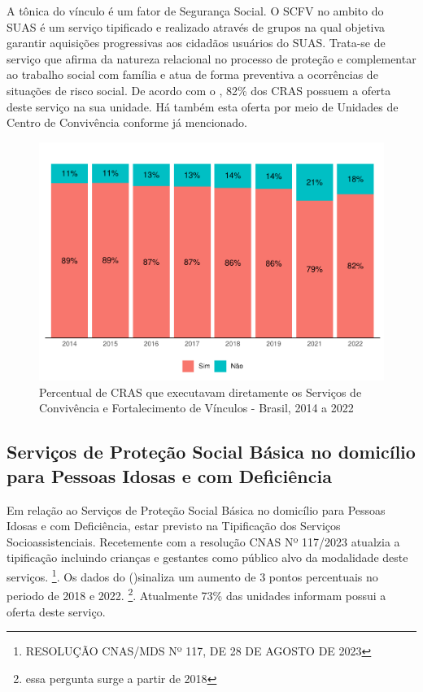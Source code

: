 \documentclass[
  brazilian]{report}
\begin{document}
A tônica do vínculo é um fator de Segurança Social. O SCFV no ambito do
SUAS é um serviço tipificado e realizado através de grupos na qual
objetiva garantir aquisições progressivas aos cidadãos usuários do SUAS.
Trata-se de serviço que afirma da natureza relacional no processo de
proteção e complementar ao trabalho social com família e atua de forma
preventiva a ocorrências de situações de risco social. De acordo com o
, 82\% dos CRAS possuem a oferta deste serviço na
sua unidade. Há também esta oferta por meio de Unidades de Centro de
Convivência conforme já mencionado.

\begin{figure}
\includegraphics{Censo-SUAS-2022_files/figure-latex/CRAS-SCFV-1} \caption[Percentual de CRAS que executavam diretamente os Serviços de Convivência e Fortalecimento de Vínculos - Brasil, 2014 a 2022]{Percentual de CRAS que executavam diretamente os Serviços de Convivência e Fortalecimento de Vínculos - Brasil, 2014 a 2022}\label{fig:CRAS-SCFV}
\end{figure}

\hypertarget{serviuxe7os-de-proteuxe7uxe3o-social-buxe1sica-no-domicuxedlio-para-pessoas-idosas-e-com-deficiuxeancia}{%
\subsection{Serviços de Proteção Social Básica no domicílio para Pessoas
Idosas e com
Deficiência}\label{serviuxe7os-de-proteuxe7uxe3o-social-buxe1sica-no-domicuxedlio-para-pessoas-idosas-e-com-deficiuxeancia}}

Em relação ao Serviços de Proteção Social Básica no domicílio para
Pessoas Idosas e com Deficiência, estar previsto na Tipificação dos
Serviços Socioassistenciais. Recetemente com a resolução CNAS Nº
117/2023 atualzia a tipificação incluindo crianças e gestantes como
público alvo da modalidade deste serviços.
\footnote{RESOLUÇÃO CNAS/MDS Nº 117, DE 28 DE AGOSTO DE 2023}. Os dados
do ()sinaliza um aumento de 3 pontos percentuais no
periodo de 2018 e 2022. \footnote{essa pergunta surge a partir de 2018}.
Atualmente 73\% das unidades informam possui a oferta deste serviço.
\end{document}
